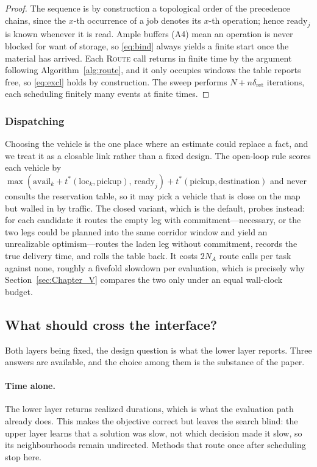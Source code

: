 \documentclass[manuscript,screen,review]{acmart}
\begin{document}
\begin{proof}
The sequence is by construction a topological order of the precedence chains,
since the $x$-th occurrence of a job denotes its $x$-th operation; hence
$\mathrm{ready}_j$ is known whenever it is read. Ample buffers (A4) mean an
operation is never blocked for want of storage, so \eqref{eq:bind} always
yields a finite start once the material has arrived. Each \textsc{Route} call
returns in finite time by the argument following Algorithm~\ref{alg:route}, and
it only occupies windows the table reports free, so \eqref{eq:excl} holds by
construction. The sweep performs $N+n\delta_{\mathrm{ret}}$ iterations, each
scheduling finitely many events at finite times.
\end{proof}

\subsubsection{Dispatching}
\label{sec:dispatch}
Choosing the vehicle is the one place where an estimate could replace a fact,
and we treat it as a closable link rather than a fixed design. The open-loop
rule scores each vehicle by
$\max(\mathrm{avail}_k+t^{*}(\mathrm{loc}_k,\text{pickup}),\,
\mathrm{ready}_j)+t^{*}(\text{pickup},\text{destination})$
and never consults the reservation table, so it may pick a vehicle that is
close on the map but walled in by traffic. The closed variant, which is the
default, probes instead: for each candidate it routes the empty leg with
commitment---necessary, or the two legs could be planned into the same corridor
window and yield an unrealizable optimism---routes the laden leg without
commitment, records the true delivery time, and rolls the table back. It costs
$2N_A$ route calls per task against none, roughly a fivefold slowdown per
evaluation, which is precisely why Section~\ref{sec:Chapter_V} compares the two
only under an equal wall-clock budget.

\subsection{What should cross the interface?}
\label{sec:interface}

Both layers being fixed, the design question is what the lower layer reports.
Three answers are available, and the choice among them is the substance of the
paper.

\paragraph{Time alone.}
The lower layer returns realized durations, which is what the evaluation path
already does. This makes the objective correct but leaves the search blind:
the upper layer learns that a solution was slow, not which decision made it
slow, so its neighbourhoods remain undirected. Methods that route once after
scheduling stop here.
\end{document}
